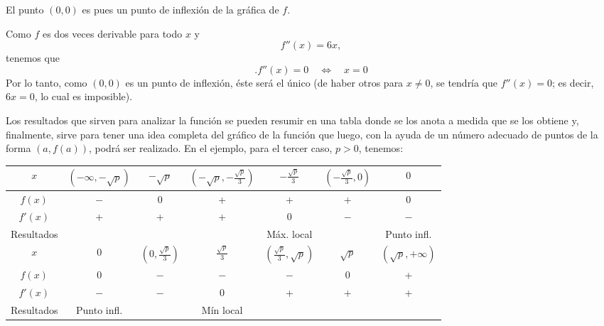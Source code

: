 \begin{exemplo}[Solución]
El punto  $(0,0)$ es pues un punto de inflexión de la gráfica de $f$.

Como $f$ es dos veces derivable para todo $x$ y
\begin{equation*}
    f''(x)=6x,
\end{equation*}
tenemos que
\begin{equation*}.
    f''(x)=0 \quad \Leftrightarrow \quad x=0
\end{equation*}
Por lo tanto, como $(0,0)$ es un punto de inflexión, éste será el único (de haber otros para $x\neq
0$, se tendría que $f''(x)=0$; es decir, $6x =0$, lo cual es imposible).

Los resultados que sirven para analizar la función se pueden resumir en una tabla donde se los
anota a medida que se los obtiene y, finalmente, sirve para tener una idea completa del gráfico de
la función que luego, con la ayuda de un número adecuado de puntos de la forma $(a, f(a))$, podrá
ser realizado. En el ejemplo, para el tercer caso, $p>0$, tenemos:
\begin{center}
\setlength\extrarowheight{5pt}
\begin{tabular}{ c | c | c | c | c | c | c}

      $x$   &   $\left (-\infty,-\sqrt{p}\right )$   &   $-\sqrt{p}$   &
      $\left (-\sqrt{p},-\frac{\sqrt{p}}{3}\right )$   &   $-\frac{\sqrt{p}}{3}$   &
      $\left (-\frac{\sqrt{p}}{3},0\right )$   &   $0$ \\
      \hline
     $f(x)$ &  $-$  &  0  &  +  &   + &  +  &    0    \\
      \hline
    $ f'(x) $&  +  &  +  &  +  &  0  & $-$   &  $-$    \\
      \hline
    Resultados &    &    &    & Máx. local   &    &   Punto infl.     \\ \hline

       $x$ &$0$   &   $\left (0,\frac{\sqrt{p}}{3}\right )$   &   $\frac{\sqrt{p}}{3}$   &   %
      $\left(\frac{\sqrt{p}}{3},\sqrt{p}\right )$   &   $\sqrt{p}$   &   $\left (\sqrt{p},+\infty\right )$ \\
      \hline
     $f(x)$ & 0   & $-$   & $-$   & $-$   &   0   &  + \\
      \hline
    $ f'(x) $&  $-$  & $-$   &  0  & +   &   +   &  +  \\
      \hline
    Resultados & Punto infl.   &    &  Mín local  &    &     &  \\ \hline
\end{tabular}
\end{center}


\end{exemplo}
